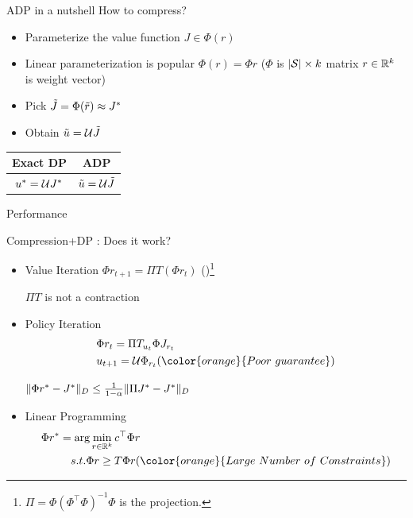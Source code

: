 \documentclass[10pt]{beamer}
\begin{document}
\begin{frame}[fragile]{ADP in a nutshell}
How to compress?
\begin{itemize}
\item Parameterize the value function $J\in \Phi(r)$
\item Linear parameterization is popular $\Phi(r)=\Phi r$ ($\Phi$ is $|\S|\times k$ matrix $r\in \R^k$ is weight vector)
\item Pick $\tj=\Phi(\tr)\approx J^*$
\item Obtain $\tu=\U \tj$
\end{itemize}
\begin{center}
\begin{table}
\begin{tabular}{|c|c|}\hline
Exact DP& ADP \\ \hline
$u^*=\U J^*$    & $\tu=\U \tj$ \\ \hline
\end{tabular}
\end{table}
\end{center}
\begin{block}{Performance}

\end{block}
\end{frame}

\begin{frame}[fragile]{Compression+DP : Does it work?}
\begin{itemize}
\item Value Iteration{\color{orange}} $\Phi r_{t+1}= \Pi T (\Phi r_t)$ ({\color{orange}{No fixed point}})\footnote{$\Pi=\Phi (\Phi^\top \Phi)^{-1}\Phi$ is the projection. }

$\Pi T$ is not a contraction

\item {Policy Iteration}{\color{orange}}
\begin{align*}
&\Phi r_t=\Pi T_{u_t} \Phi J_{r_t} \\
&u_{t+1}=\U \Phi_{r_t}\text({\color{orange}{Poor~guarantee}})
\end{align*}

$\norm{\Phi r^*-J^*}_D\leq \frac{1}{1-\alpha}\norm{\Pi J^*-J^*}_D$
\item {Linear Programming}{\color{orange}}
\begin{align*}
\Phi r^*&=\arg\min_{r\in \R^{k}} c^\top \Phi r\\
&\quad s.t. \Phi r\geq T \Phi r ({\color{orange}{Large~Number~of~Constraints}})
\end{align*}
\end{itemize}
\end{frame}
\end{document}
